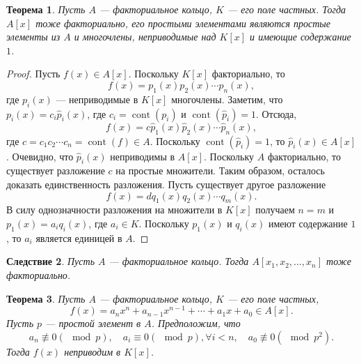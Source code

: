 \documentclass[12pt, titlepage, oneside]{amsbook}
\newcommand{\cont}{\operatorname{cont}}
\newtheorem{theorem}{Теорема}[chapter]
\newtheorem{corollary}[theorem]{Следствие}
\theoremstyle{definition}
\theoremstyle{remark}
\begin{document}
\begin{theorem}
	\label{Mn2-6}
	Пусть $A$ --- факториальное кольцо, $K$ --- его поле частных. Тогда $A[x]$ тоже факториально, его простыми элементами являются простые элементы из $A$ и многочлены, неприводимые над $K[x]$ и имеющие содержание $1$.
\end{theorem}

\begin{proof}
	Пусть $f(x)\in A[x]$. Поскольку $K[x]$ факториально, то $$f(x)=p_1(x)p_2(x)\cdots p_n(x),$$ где $p_i(x)$ --- неприводимые в $K[x]$ многочлены. Заметим, что $p_i(x)=c_i\hat{p}_i(x)$, где $c_i=\cont(p_i)$ и $\cont(\hat{p}_i)=1$. Отсюда, $$f(x)=c\hat{p}_1(x)\hat{p}_2(x)\cdots\hat{p}_n(x),$$ где $c=c_1c_2\cdots c_n=\cont(f)\in A$. Поскольку $\cont(\hat{p}_i)=1$, то $\hat{p}_i(x)\in A[x]$. Очевидно, что $\hat{p}_i(x)$ неприводимы в $A[x]$. Поскольку $A$ факториально, то существует разложение $c$ на простые множители. Таким образом, осталось доказать единственность разложения. Пусть существует другое разложение $$f(x)=dq_1(x)q_2(x)\cdots q_m(x).$$ В силу однозначности разложения на множители в $K[x]$ получаем $n=m$ и $p_1(x)=a_iq_i(x)$, где $a_i\in K$. Поскольку $p_1(x)$ и $q_i(x)$ имеют содержание $1$, то $a_i$ является единицей в $A$.
\end{proof}

\begin{corollary}
	\label{Mn2-7}
	Пусть $A$ --- факториальное кольцо. Тогда $A[x_1,x_2,\ldots,x_n]$ тоже факториально.
\end{corollary}

\begin{theorem}
	\label{Mn2-8}
	Пусть $A$ --- факториальное кольцо, $K$ --- его поле частных, $$f(x)=a_nx^n+a_{n-1}x^{n-1}+\cdots+a_1x+a_0\in A[x].$$ Пусть $p$ --- простой элемент в $A$. Предположим, что $$a_n\not\equiv 0 (\mod p),\quad a_i\equiv 0(\mod p), \forall i<n,\quad a_0\not\equiv 0 (\mod p^2).$$ Тогда $f(x)$ неприводим в $K[x]$.
\end{theorem}
\end{document}
